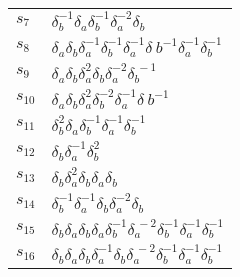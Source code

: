 \documentclass{article}
\begin{document}
\begin{center}
\begin{tabular}{ll}
$s_{7}$ & $\delta_b^{-1}\delta_a^{}\delta_b^{-1}\delta_a^{-2}\delta_b^{}$ \\
$s_{8}$ & $\delta_a^{}\delta_b^{}\delta_a^{-1}\delta_b^{-1}\delta_a^{-1}\delta_\
b^{-1}\delta_a^{-1}\delta_b^{-1}$ \\
$s_{9}$ & $\delta_a^{}\delta_b^{}\delta_a^{2}\delta_b^{}\delta_a^{-2}\delta_b^{\
-1}$ \\
$s_{10}$ & $\delta_a^{}\delta_b^{}\delta_a^{2}\delta_b^{-2}\delta_a^{-1}\delta_\
b^{-1}$ \\
$s_{11}$ & $\delta_b^{2}\delta_a^{}\delta_b^{-1}\delta_a^{-1}\delta_b^{-1}$ \\
$s_{12}$ & $\delta_b^{}\delta_a^{-1}\delta_b^{2}$ \\
$s_{13}$ & $\delta_b^{}\delta_a^{2}\delta_b^{}\delta_a^{}\delta_b^{}$ \\
$s_{14}$ & $\delta_b^{-1}\delta_a^{-1}\delta_b^{}\delta_a^{-2}\delta_b^{}$ \\
$s_{15}$ & $\delta_b^{}\delta_a^{}\delta_b^{}\delta_a^{}\delta_b^{-1}\delta_a^{\
-2}\delta_b^{-1}\delta_a^{-1}\delta_b^{-1}$ \\
$s_{16}$ & $\delta_b^{}\delta_a^{}\delta_b^{}\delta_a^{-1}\delta_b^{}\delta_a^{\
-2}\delta_b^{-1}\delta_a^{-1}\delta_b^{-1}$ \\
\bottomrule
\end{tabular}
\end{center}

\thispagestyle{empty}
\end{document}
